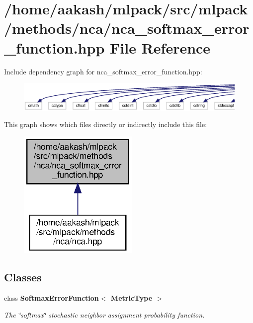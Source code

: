 \section{/home/aakash/mlpack/src/mlpack/methods/nca/nca\+\_\+softmax\+\_\+error\+\_\+function.hpp File Reference}
\label{nca__softmax__error__function_8hpp}
Include dependency graph for nca\+\_\+softmax\+\_\+error\+\_\+function.\+hpp\+:
\nopagebreak
\begin{figure}[H]
\begin{center}
\leavevmode
\includegraphics[width=350pt]{nca__softmax__error__function_8hpp__incl}
\end{center}
\end{figure}
This graph shows which files directly or indirectly include this file\+:
\nopagebreak
\begin{figure}[H]
\begin{center}
\leavevmode
\includegraphics[width=163pt]{nca__softmax__error__function_8hpp__dep__incl}
\end{center}
\end{figure}
\subsection*{Classes}
\begin{DoxyCompactItemize}
\item 
class \textbf{ Softmax\+Error\+Function$<$ Metric\+Type $>$}
\begin{DoxyCompactList}\small\item\em The \char`\"{}softmax\char`\"{} stochastic neighbor assignment probability function. \end{DoxyCompactList}\end{DoxyCompactItemize}
